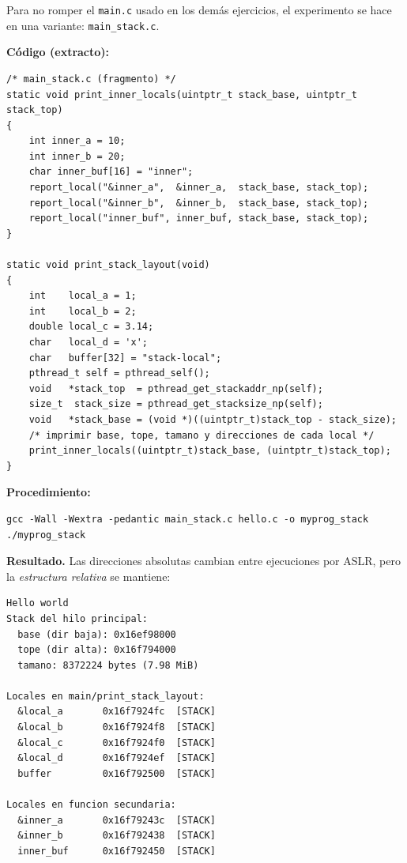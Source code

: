 \documentclass[11pt,a4paper]{article}
\begin{document}
Para no romper el \texttt{main.c} usado en los demás ejercicios, el
experimento se hace en una variante: \texttt{main\_stack.c}.

\textbf{Código (extracto):}

\begin{lstlisting}[style=cstyle]
/* main_stack.c (fragmento) */
static void print_inner_locals(uintptr_t stack_base, uintptr_t stack_top)
{
    int inner_a = 10;
    int inner_b = 20;
    char inner_buf[16] = "inner";
    report_local("&inner_a",  &inner_a,  stack_base, stack_top);
    report_local("&inner_b",  &inner_b,  stack_base, stack_top);
    report_local("inner_buf", inner_buf, stack_base, stack_top);
}

static void print_stack_layout(void)
{
    int    local_a = 1;
    int    local_b = 2;
    double local_c = 3.14;
    char   local_d = 'x';
    char   buffer[32] = "stack-local";
    pthread_t self = pthread_self();
    void   *stack_top  = pthread_get_stackaddr_np(self);
    size_t  stack_size = pthread_get_stacksize_np(self);
    void   *stack_base = (void *)((uintptr_t)stack_top - stack_size);
    /* imprimir base, tope, tamano y direcciones de cada local */
    print_inner_locals((uintptr_t)stack_base, (uintptr_t)stack_top);
}
\end{lstlisting}

\textbf{Procedimiento:}

\begin{lstlisting}
gcc -Wall -Wextra -pedantic main_stack.c hello.c -o myprog_stack
./myprog_stack
\end{lstlisting}

\textbf{Resultado.} Las direcciones absolutas cambian entre
ejecuciones por ASLR, pero la \emph{estructura relativa} se mantiene:

\begin{lstlisting}[style=outstyle]
Hello world
Stack del hilo principal:
  base (dir baja): 0x16ef98000
  tope (dir alta): 0x16f794000
  tamano: 8372224 bytes (7.98 MiB)

Locales en main/print_stack_layout:
  &local_a       0x16f7924fc  [STACK]
  &local_b       0x16f7924f8  [STACK]
  &local_c       0x16f7924f0  [STACK]
  &local_d       0x16f7924ef  [STACK]
  buffer         0x16f792500  [STACK]

Locales en funcion secundaria:
  &inner_a       0x16f79243c  [STACK]
  &inner_b       0x16f792438  [STACK]
  inner_buf      0x16f792450  [STACK]
\end{lstlisting}
\end{document}
